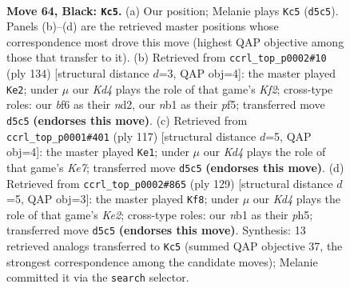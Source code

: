 \documentclass[11pt]{article}
\begin{document}
\clearpage

\begin{figure}[p]\centering
\begin{subfigure}{0.46\textwidth}\centering
\resizebox{\linewidth}{!}{%
\newchessgame
\chessboard[
  setfen={8/8/p4B2/3k4/2p3b1/8/5K2/1N6 b - - 27 64},
  showmover=false,
  pgfstyle=straightmove, color=movearrow, markmove={d5-c5}
]}
\caption{}
\end{subfigure}\hfill
\begin{subfigure}{0.46\textwidth}\centering
\resizebox{\linewidth}{!}{%
\newchessgame
\chessboard[
  setfen={3B4/8/8/5p1k/8/4P3/3n1K1P/8 w - - 6 68},
  showmover=false,
  pgfstyle=straightmove, color=movearrow, markmove={f2-e2}
]}
\caption{}
\end{subfigure}
\\[4pt]
\begin{subfigure}{0.46\textwidth}\centering
\resizebox{\linewidth}{!}{%
\newchessgame
\chessboard[
  setfen={8/8/8/1P6/3K4/8/2Bpk3/7b b - - 3 59},
  showmover=false,
  pgfstyle=straightmove, color=movearrow, markmove={e2-e1}
]}
\caption{}
\end{subfigure}\hfill
\begin{subfigure}{0.46\textwidth}\centering
\resizebox{\linewidth}{!}{%
\newchessgame
\chessboard[
  setfen={2b5/4kp2/8/7P/5K2/8/1B6/8 b - - 1 65},
  showmover=false,
  pgfstyle=straightmove, color=movearrow, markmove={e7-f8}
]}
\caption{}
\end{subfigure}
\caption{\textbf{Move 64, Black: \texttt{Kc5}.} (a) Our position; Melanie plays \texttt{Kc5} (\texttt{d5c5}). Panels (b)--(d) are the retrieved master positions whose correspondence most drove this move (highest QAP objective among those that transfer to it). (b) Retrieved from \texttt{ccrl\_top\_p0002\#10} (ply 134) [structural distance $d$=3, QAP obj=4]: the master played \texttt{Ke2}; under $\mu$ our \emph{Kd4} plays the role of that game's \emph{Kf2}; cross-type roles: our \emph{b}f6 as their \emph{n}d2, our \emph{n}b1 as their \emph{p}f5; transferred move \texttt{d5c5} \textbf{(endorses this move)}. (c) Retrieved from \texttt{ccrl\_top\_p0001\#401} (ply 117) [structural distance $d$=5, QAP obj=4]: the master played \texttt{Ke1}; under $\mu$ our \emph{Kd4} plays the role of that game's \emph{Ke7}; transferred move \texttt{d5c5} \textbf{(endorses this move)}. (d) Retrieved from \texttt{ccrl\_top\_p0002\#865} (ply 129) [structural distance $d$=5, QAP obj=3]: the master played \texttt{Kf8}; under $\mu$ our \emph{Kd4} plays the role of that game's \emph{Ke2}; cross-type roles: our \emph{n}b1 as their \emph{p}h5; transferred move \texttt{d5c5} \textbf{(endorses this move)}. Synthesis: 13 retrieved analogs transferred to \texttt{Kc5} (summed QAP objective 37, the strongest correspondence among the candidate moves); Melanie committed it via the \texttt{search} selector.}
\label{fig:thought-m127}
\end{figure}
\end{document}
